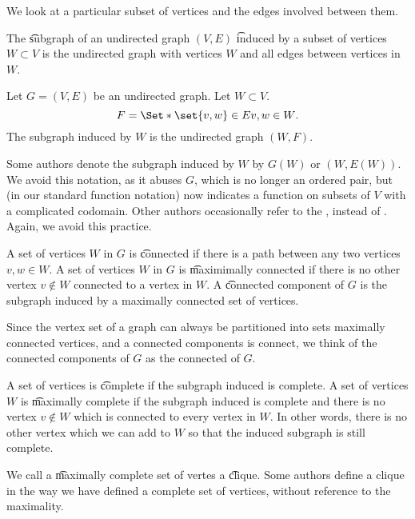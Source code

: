 

We look at a particular subset of vertices and the edges involved between them.


The \t{subgraph} of an undirected graph $(V, E)$ \t{induced by} a subset of vertices $W \subset V$ is the undirected graph with vertices $W$ and all edges between vertices in $W$.


Let $G = (V, E)$ be an undirected graph.
Let $W \subset V$.
\[
  F = \Set*{\set{v, w} \in E}{v, w \in W}.
\]
The subgraph induced by $W$ is the undirected graph $(W, F)$.

Some authors denote the subgraph induced by $W$ by $G(W)$ or $(W, E(W))$.
We avoid this notation, as it abuses $G$, which is no longer an ordered pair, but (in our standard function notation) now indicates a function on subsets of $V$ with a complicated codomain.
Other authors occasionally refer to the , instead of .
Again, we avoid this practice.


A set of vertices $W$ in $G$ is \t{connected} if there is a path between any two vertices $v, w \in W$.
A set of vertices $W$ in $G$ is \t{maximimally connected} if there is no other vertex $v \not \in W$ connected to a vertex in $W$.
A \t{connected component} of $G$ is the subgraph induced by a maximally connected set of vertices.

Since the vertex set of a graph can always be partitioned into sets maximally connected vertices, and a connected components is connect, we think of the connected components of $G$ as the connected  of $G$.


A set of vertices is \t{complete} if the subgraph induced is complete.
A set of vertices $W$ is \t{maximally complete} if the subgraph induced is complete and there is no vertex $v \not\in W$ which is connected to every vertex in $W$.
In other words, there is no other vertex which we can add to $W$ so that the induced subgraph is still complete.

We call a \t{maximally complete} set of vertes a \t{clique}.
Some authors define a clique in the way we have defined a complete set of vertices, without reference to the maximality.

